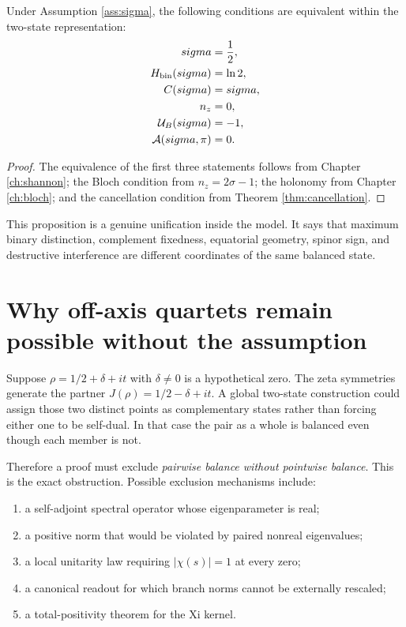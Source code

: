 \begin{proposition}
Under Assumption \ref{ass:sigma}, the following conditions are equivalent within the two-state representation:
\begin{align}
sigma&=\frac12,\\
H_{\mathrm{bin}}(sigma)&=\ln2,\\
C(sigma)&=sigma,\\
n_z&=0,\\
\mathcal U_B(sigma)&=-1,\\
\mathcal A(sigma,\pi)&=0.
\end{align}
\end{proposition}

\begin{proof}
The equivalence of the first three statements follows from Chapter \ref{ch:shannon}; the Bloch condition from $n_z=2\sigma-1$; the holonomy from Chapter \ref{ch:bloch}; and the cancellation condition from Theorem \ref{thm:cancellation}.
\end{proof}

This proposition is a genuine unification inside the model. It says that maximum binary distinction, complement fixedness, equatorial geometry, spinor sign, and destructive interference are different coordinates of the same balanced state.

\section{Why off-axis quartets remain possible without the assumption}
Suppose $\rho=1/2+\delta+it$ with $\delta\neq0$ is a hypothetical zero. The zeta symmetries generate the partner $J(\rho)=1/2-\delta+it$. A global two-state construction could assign those two distinct points as complementary states rather than forcing either one to be self-dual. In that case the pair as a whole is balanced even though each member is not.

Therefore a proof must exclude \emph{pairwise balance without pointwise balance}. This is the exact obstruction. Possible exclusion mechanisms include:
\begin{enumerate}
\item a self-adjoint spectral operator whose eigenparameter is real;
\item a positive norm that would be violated by paired nonreal eigenvalues;
\item a local unitarity law requiring $|\chi(s)|=1$ at every zero;
\item a canonical readout for which branch norms cannot be externally rescaled;
\item a total-positivity theorem for the Xi kernel.
\end{enumerate}

